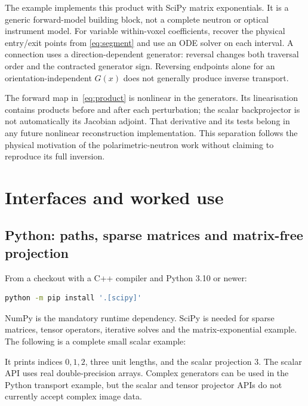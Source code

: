 \documentclass[11pt,a4paper]{article}
\newcommand{\code}[1]{\texttt{\detokenize{#1}}}
\begin{document}
The example \code{examples/nonabelian_transport.py} implements this product
with SciPy matrix exponentials. It is a generic forward-model building
block, not a complete neutron or optical instrument model. For variable
within-voxel coefficients, recover the physical entry/exit points from
\eqref{eq:segment} and use an ODE solver on each interval. A connection
uses a direction-dependent generator: reversal changes both traversal
order and the contracted generator sign. Reversing endpoints alone for an
orientation-independent $G(x)$ does not generally produce inverse transport.

The forward map in~\eqref{eq:product} is nonlinear in the generators. Its
linearisation contains products before and after each perturbation; the
scalar backprojector is not automatically its Jacobian adjoint. That
derivative and its tests belong in any future nonlinear reconstruction
implementation. This separation follows the physical motivation of the
polarimetric-neutron work without claiming to reproduce its full inversion.

\section{Interfaces and worked use}
\label{sec:examples}
\subsection{Python: paths, sparse matrices and matrix-free projection}
From a checkout with a C++ compiler and Python 3.10 or newer:
\par\noindent\begin{minipage}{\linewidth}
\begin{lstlisting}[language=bash]
python -m pip install '.[scipy]'
\end{lstlisting}
\end{minipage}\par
NumPy is the mandatory runtime dependency. SciPy is needed for sparse
matrices, tensor operators, iterative solves and the matrix-exponential
example. The following is a complete small scalar example:
\par\noindent\begin{minipage}{\linewidth}

\end{minipage}\par
It prints indices $0,1,2$, three unit lengths, and the scalar projection
$3$. The scalar API uses real double-precision arrays. Complex generators
can be used in the Python transport example, but the scalar and tensor
projector APIs do not currently accept complex image data.
\end{document}
